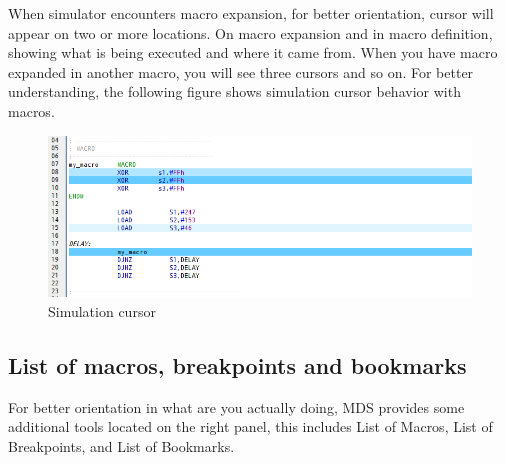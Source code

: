         When simulator encounters macro expansion, for better orientation, cursor will appear on two or more locations.
        On macro expansion and in macro definition, showing what is being executed and where it came from. When you have
        macro expanded in another macro, you will see three cursors and so on. For better understanding, the following
        figure shows simulation cursor behavior with macros.
        \begin{figure}[h!]
            \centering
            \includegraphics[width=\textwidth]{img/simulationcursor2.png}
            \caption{Simulation cursor}
        \end{figure}

    \subsection{List of macros, breakpoints and bookmarks}
        For better orientation in what are you actually doing, MDS provides some additional tools located on the right
        panel, this includes List of Macros, List of Breakpoints, and List of Bookmarks.

